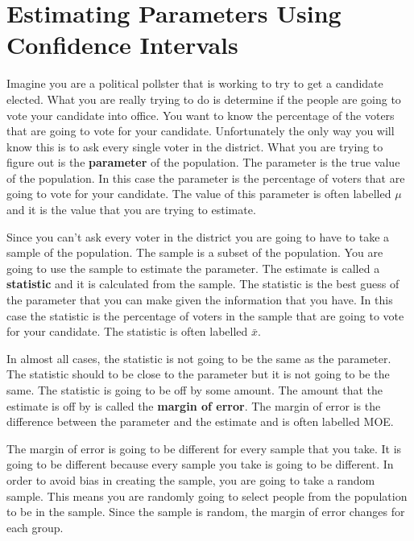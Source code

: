 \documentclass[
  letterpaper,
  DIV=11,
  numbers=noendperiod]{scrreprt}
\begin{document}
\chapter*{Estimating Parameters Using Confidence
Intervals}\label{estimating-parameters-using-confidence-intervals}


Imagine you are a political pollster that is working to try to get a
candidate elected. What you are really trying to do is determine if the
people are going to vote your candidate into office. You want to know
the percentage of the voters that are going to vote for your candidate.
Unfortunately the only way you will know this is to ask every single
voter in the district. What you are trying to figure out is the
\textbf{parameter} of the population. The parameter is the true value of
the population. In this case the parameter is the percentage of voters
that are going to vote for your candidate. The value of this parameter
is often labelled \(\mu\) and it is the value that you are trying to
estimate.

Since you can't ask every voter in the district you are going to have to
take a sample of the population. The sample is a subset of the
population. You are going to use the sample to estimate the parameter.
The estimate is called a \textbf{statistic} and it is calculated from
the sample. The statistic is the best guess of the parameter that you
can make given the information that you have. In this case the statistic
is the percentage of voters in the sample that are going to vote for
your candidate. The statistic is often labelled \(\bar{x}\).

In almost all cases, the statistic is not going to be the same as the
parameter. The statistic should to be close to the parameter but it is
not going to be the same. The statistic is going to be off by some
amount. The amount that the estimate is off by is called the
\textbf{margin of error}. The margin of error is the difference between
the parameter and the estimate and is often labelled MOE.

The margin of error is going to be different for every sample that you
take. It is going to be different because every sample you take is going
to be different. In order to avoid bias in creating the sample, you are
going to take a random sample. This means you are randomly going to
select people from the population to be in the sample. Since the sample
is random, the margin of error changes for each group.
\end{document}
